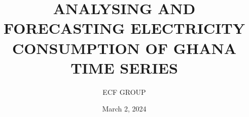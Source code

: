 \documentclass{beamer}
\author{ECF GROUP}
\title{ ANALYSING AND FORECASTING ELECTRICITY CONSUMPTION OF GHANA TIME SERIES}
\date{March 2, 2024}
\begin{document}
	
	
	\begin{frame}
		\titlepage
	\end{frame}
	
	
	
\end{document}
